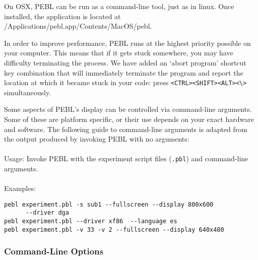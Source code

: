 On OSX, PEBL can be run as a command-line tool, just as in linux.  Once installed, the application is located at /Applications/pebl.app/Contents/MacOS/pebl. 


In order to improve performance, PEBL runs at the highest
priority possible on your computer.  This means that if it
gets stuck somewhere, you may have difficulty terminating the
process.  We have added an `abort program' shortcut key
combination that will immediately terminate the program and
report the location at which it became stuck in your code: \newline press \verb+<CTRL><SHIFT><ALT><\>+ simultaneously.
  

\label{sec:2.5}
Some aspects of PEBL's display can be controlled via
command-line arguments.  Some of these are platform
specific, or their use depends on your exact hardware and
software. The following guide to command-line
arguments is adapted from the output produced by
invoking PEBL  with no arguments:\\
\\
Usage:  Invoke PEBL with the experiment script files (\texttt{.pbl})
and  command-line arguments.\\
\\
Examples:
\begin{verbatim}
pebl experiment.pbl -s sub1 --fullscreen --display 800x600
      --driver dga
pebl experiment.pbl --driver xf86  --language es
pebl experiment.pbl -v 33 -v 2 --fullscreen --display 640x480 
\end{verbatim}
 

\subsubsection{Command-Line Options}

